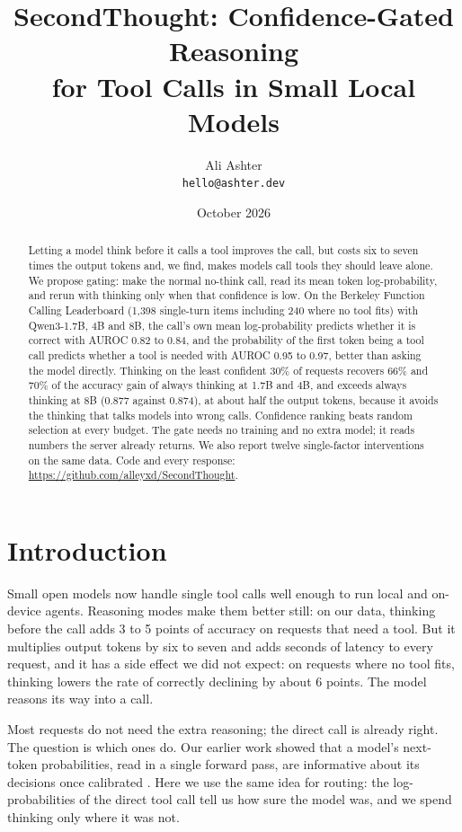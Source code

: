 \documentclass[10pt,twocolumn]{article}
\title{SecondThought: Confidence-Gated Reasoning\\for Tool Calls in Small Local Models}
\author{Ali Ashter\\\texttt{hello@ashter.dev}}
\date{October 2026}
\newcommand{\repo}{\url{https://github.com/alleyxd/SecondThought}}
\begin{document}
\maketitle

\begin{abstract}
Letting a model think before it calls a tool improves the call, but costs six to seven times the output tokens and,
we find, makes models call tools they should leave alone. We propose gating: make the normal no-think call, read its
mean token log-probability, and rerun with thinking only when that confidence is low. On the Berkeley Function Calling
Leaderboard (1,398 single-turn items including 240 where no tool fits) with Qwen3-1.7B, 4B and 8B, the call's own
mean log-probability predicts whether it is correct with AUROC 0.82 to 0.84, and the probability of the first token
being a tool call predicts whether a tool is needed with AUROC 0.95 to 0.97, better than asking the model directly.
Thinking on the least confident 30\% of requests recovers 66\% and 70\% of the accuracy gain of always thinking at
1.7B and 4B, and exceeds always thinking at 8B (0.877 against 0.874), at about half the output tokens, because it
avoids the thinking that talks models into wrong calls. Confidence ranking beats random selection at every budget.
The gate needs no training and no extra model; it reads numbers the server already returns. We also report twelve
single-factor interventions on the same data. Code and every response: \repo.
\end{abstract}

\section{Introduction}

Small open models now handle single tool calls well enough to run local and on-device agents. Reasoning modes make
them better still: on our data, thinking before the call adds 3 to 5 points of accuracy on requests that need a tool.
But it multiplies output tokens by six to seven and adds seconds of latency to every request, and it has a side
effect we did not expect: on requests where no tool fits, thinking lowers the rate of correctly declining by about 6
points. The model reasons its way into a call.

Most requests do not need the extra reasoning; the direct call is already right. The question is which ones do. Our
earlier work showed that a model's next-token probabilities, read in a single forward pass, are informative about its
decisions once calibrated \cite{anydecide}. Here we use the same idea for routing: the log-probabilities of the direct
tool call tell us how sure the model was, and we spend thinking only where it was not.
\end{document}
